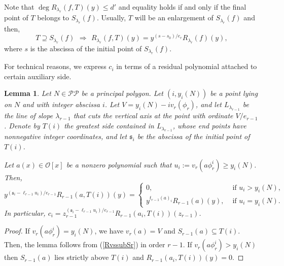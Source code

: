 \documentclass{amsart}
\newtheorem{lemma}[theorem]{Lemma}
\def\op{\operatorname}
\def\as#1{\renewcommand\arraystretch{#1}}
\def\dg{\op{deg}}
\def\imp{\,\Longrightarrow\,}
\def\la{\lambda}
\def\oo{{\mathcal O}}
\def\pol{{\mathcal P}{\mathcal P}}
\def\zpx{\oo[x]}
\begin{document}
Note that $\dg R_{\la_r}(f,T)(y)\le d'$ and equality holds if and only if the final point of $T$ belongs to $S_{\la_r}(f)$. Usually, $T$ will be an enlargement of $S_{\la_r}(f)$ and then,
\begin{equation}\label{RvssubSr}
T\supseteq S_{\la_r}(f)\ \imp\ R_{\la_r}(f,T)(y)=y^{(s-s_0)/e_r}R_{\la_r}(f)(y), 
\end{equation}
where $s$ is the abscissa of the initial point of $S_{\la_r}(f)$.

For technical reasons, we express $c_i$ in terms of a residual polynomial attached to certain auxiliary side.

\begin{lemma}\label{enlarge}
Let $N\in\pol$ be a principal polygon. Let $(i,y_i(N))$  be a point lying on $N$ and with integer abscissa $i$.
Let $V=y_i(N)-iv_r(\phi_r)$, and let $L_{\la_{r-1}}$ be the line of slope $\la_{r-1}$ that cuts the vertical axis at the point with ordinate $V/e_{r-1}$.  Denote by $T(i)$ the greatest side contained in $L_{\la_{r-1}}$, whose end points have nonnegative integer coordinates, and let
 $\mathfrak{s}_i$ be the abscissa of the initial point of $T(i)$.

Let  $a(x)\in\zpx$ be a nonzero polynomial such that $u_i:=v_r(a\phi_r^i)\ge y_i(N)$. Then,
$$\as{1.4}
y^{(\mathfrak{s}_i-\ell_{r-1} u_i)/e_{r-1}}R_{r-1}(a,T(i))(y)=
\left\{\begin{array}{ll}
0,&\mbox{ if }u_i>y_i(N),\\y^{t_{r-1}(a)_i}R_{r-1}(a)(y),&\mbox{ if }u_i=y_i(N).
\end{array}
\right.
$$
In particular, $c_i=z_{r-1}^{(\mathfrak{s}_i-\ell_{r-1} u_i)/e_{r-1}}R_{r-1}(a_i,T(i))(z_{r-1})$.
\end{lemma}

\begin{proof}
If $v_r(a\phi_r^i)=y_i(N)$, we have $v_r(a)=V$ and $S_{r-1}(a)\subseteq T(i)$. Then, the lemma follows from (\ref{RvssubSr}) in order $r-1$. If $v_r(a\phi_r^i)>y_i(N)$ then $S_{r-1}(a)$ lies strictly above $T(i)$ and $R_{r-1}(a_i,T(i))(y)=0$. 
\end{proof}
\end{document}
